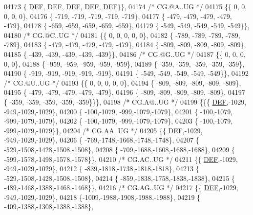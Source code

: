 \begin{DoxyCode}
04173 \{  \mbox{\hyperlink{1_88_84__epars_8h_a397419fc12b37ed479c8abb9d444d843}{DEF}},  \mbox{\hyperlink{1_88_84__epars_8h_a397419fc12b37ed479c8abb9d444d843}{DEF}},  \mbox{\hyperlink{1_88_84__epars_8h_a397419fc12b37ed479c8abb9d444d843}{DEF}},  \mbox{\hyperlink{1_88_84__epars_8h_a397419fc12b37ed479c8abb9d444d843}{DEF}},  \mbox{\hyperlink{1_88_84__epars_8h_a397419fc12b37ed479c8abb9d444d843}{DEF}}\}\},
04174 \textcolor{comment}{/* CG.@A..UG */}
04175 \{\{    0,    0,    0,    0,    0\},
04176 \{ -719, -719, -719, -719, -719\},
04177 \{ -479, -479, -479, -479, -479\},
04178 \{ -659, -659, -659, -659, -659\},
04179 \{ -549, -549, -549, -549, -549\}\},
04180 \textcolor{comment}{/* CG.@C..UG */}
04181 \{\{    0,    0,    0,    0,    0\},
04182 \{ -789, -789, -789, -789, -789\},
04183 \{ -479, -479, -479, -479, -479\},
04184 \{ -809, -809, -809, -809, -809\},
04185 \{ -439, -439, -439, -439, -439\}\},
04186 \textcolor{comment}{/* CG.@G..UG */}
04187 \{\{    0,    0,    0,    0,    0\},
04188 \{ -959, -959, -959, -959, -959\},
04189 \{ -359, -359, -359, -359, -359\},
04190 \{ -919, -919, -919, -919, -919\},
04191 \{ -549, -549, -549, -549, -549\}\},
04192 \textcolor{comment}{/* CG.@U..UG */}
04193 \{\{    0,    0,    0,    0,    0\},
04194 \{ -809, -809, -809, -809, -809\},
04195 \{ -479, -479, -479, -479, -479\},
04196 \{ -809, -809, -809, -809, -809\},
04197 \{ -359, -359, -359, -359, -359\}\}\},
04198 \textcolor{comment}{/* CG.A@..UG */}
04199 \{\{\{  \mbox{\hyperlink{1_88_84__epars_8h_a397419fc12b37ed479c8abb9d444d843}{DEF}},-1029, -949,-1029,-1029\},
04200 \{ -100,-1079, -999,-1079,-1079\},
04201 \{ -100,-1079, -999,-1079,-1079\},
04202 \{ -100,-1079, -999,-1079,-1079\},
04203 \{ -100,-1079, -999,-1079,-1079\}\},
04204 \textcolor{comment}{/* CG.AA..UG */}
04205 \{\{  \mbox{\hyperlink{1_88_84__epars_8h_a397419fc12b37ed479c8abb9d444d843}{DEF}},-1029, -949,-1029,-1029\},
04206 \{ -769,-1748,-1668,-1748,-1748\},
04207 \{ -529,-1508,-1428,-1508,-1508\},
04208 \{ -709,-1688,-1608,-1688,-1688\},
04209 \{ -599,-1578,-1498,-1578,-1578\}\},
04210 \textcolor{comment}{/* CG.AC..UG */}
04211 \{\{  \mbox{\hyperlink{1_88_84__epars_8h_a397419fc12b37ed479c8abb9d444d843}{DEF}},-1029, -949,-1029,-1029\},
04212 \{ -839,-1818,-1738,-1818,-1818\},
04213 \{ -529,-1508,-1428,-1508,-1508\},
04214 \{ -859,-1838,-1758,-1838,-1838\},
04215 \{ -489,-1468,-1388,-1468,-1468\}\},
04216 \textcolor{comment}{/* CG.AG..UG */}
04217 \{\{  \mbox{\hyperlink{1_88_84__epars_8h_a397419fc12b37ed479c8abb9d444d843}{DEF}},-1029, -949,-1029,-1029\},
04218 \{-1009,-1988,-1908,-1988,-1988\},
04219 \{ -409,-1388,-1308,-1388,-1388\},

\end{DoxyCode}

